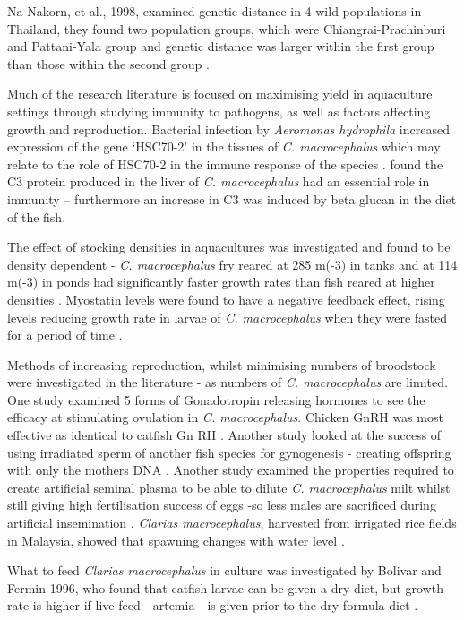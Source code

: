 \documentclass[]{book}
\theoremstyle{definition}
\theoremstyle{definition}
\theoremstyle{definition}
\theoremstyle{remark}
\begin{document}
Na Nakorn, et al., 1998, examined genetic distance in 4 wild populations
in Thailand, they found two population groups, which were
Chiangrai-Prachinburi and Pattani-Yala group and genetic distance was
larger within the first group than those within the second group
\citep{Na_Nakorn_1998}.

Much of the research literature is focused on maximising yield in
aquaculture settings through studying immunity to pathogens, as well as
factors affecting growth and reproduction. Bacterial infection by
\emph{Aeromonas hydrophila} increased expression of the gene `HSC70-2'
in the tissues of \emph{C. macrocephalus} which may relate to the role
of HSC70-2 in the immune response of the species \citep{Poompoung_2012}.
\citet{Poompoung_2012} found the C3 protein produced in the liver of
\emph{C. macrocephalus} had an essential role in immunity -- furthermore
an increase in C3 was induced by beta glucan in the diet of the fish.

The effect of stocking densities in aquacultures was investigated and
found to be density dependent - \emph{C. macrocephalus} fry reared at
285 m(-3) in tanks and at 114 m(-3) in ponds had significantly faster
growth rates than fish reared at higher densities \citep{Bombeo_2002}.
Myostatin levels were found to have a negative feedback effect, rising
levels reducing growth rate in larvae of \emph{C. macrocephalus} when
they were fasted for a period of time \citep{Kanjanaworakul_2014}.

Methods of increasing reproduction, whilst minimising numbers of
broodstock were investigated in the literature - as numbers of \emph{C.
macrocephalus} are limited. One study examined 5 forms of Gonadotropin
releasing hormones to see the efficacy at stimulating ovulation in
\emph{C. macrocephalus}. Chicken GnRH was most effective as identical to
catfish Gn RH \citep{Ngamvongchon_1992}. Another study looked at the
success of using irradiated sperm of another fish species for
gynogenesis - creating offspring with only the mothers DNA
\citep{Na_Nakorn_2004}. Another study examined the properties required
to create artificial seminal plasma to be able to dilute \emph{C.
macrocephalus} milt whilst still giving high fertilisation success of
eggs -so less males are sacrificed during artificial insemination
\citep{Tan_Fermin_1999}. \emph{Clarias macrocephalus}, harvested from
irrigated rice fields in Malaysia, showed that spawning changes with
water level \citep{Ali_1993}.

What to feed \emph{Clarias macrocephalus} in culture was investigated by
Bolivar and Fermin 1996, who found that catfish larvae can be given a
dry diet, but growth rate is higher if live feed - artemia - is given
prior to the dry formula diet \citep{Fermin_1996}.
\end{document}
